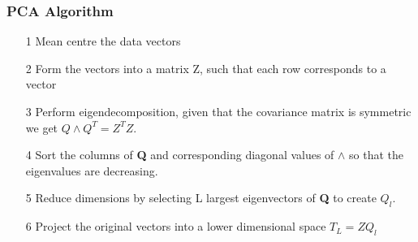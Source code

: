 \subsubsection{PCA Algorithm}

\begin{itemize}
    \item [1] Mean centre the data vectors
    \item [2] Form the vectors into a matrix Z, such that each row corresponds to a vector
    \item [3] Perform eigendecomposition, given that the covariance matrix is symmetric we get $Q\land Q^{T}=Z^{T}Z$.
    \item [4] Sort the columns of \textbf{Q} and corresponding diagonal values of $\land$ so that the eigenvalues are decreasing.
    \item [5] Reduce dimensions by selecting L largest eigenvectors of \textbf{Q} to create \textbf{$Q_{l}$}.
    \item [6] Project the original vectors into a lower dimensional space $T_{L} = ZQ_{l}$
\end{itemize}